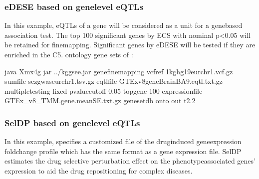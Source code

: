 \documentclass[letterpaper,10pt,english,openany,oneside]{sphinxmanual}
\begin{document}
\subsubsection{eDESE based on gene\sphinxhyphen{}level eQTLs}
\label{\detokenize{detailed_document:edese-based-on-gene-level-eqtls}}
\sphinxAtStartPar
In this example, eQTLs of a gene will be considered as a unit for a gene\sphinxhyphen{}based association test. The top 100 significant genes by ECS with nominal p\textless{}0.05 will be retained for fine\sphinxhyphen{}mapping. Significant genes by eDESE will be tested if they are enriched in the C5. ontology gene sets of :

\begin{sphinxVerbatim}[commandchars=\\\{\}]
java \PYGZhy{}Xmx4g \PYGZhy{}jar ../kggsee.jar 
  \PYGZhy{}\PYGZhy{}gene\PYGZhy{}finemapping 
  \PYGZhy{}\PYGZhy{}vcf\PYGZhy{}ref 1kg\PYGZus{}hg19\PYGZus{}eur\PYGZus{}chr1.vcf.gz 
  \PYGZhy{}\PYGZhy{}sum\PYGZhy{}file scz\PYGZus{}gwas\PYGZus{}eur\PYGZus{}chr1.tsv.gz 
  \PYGZhy{}\PYGZhy{}eqtl\PYGZhy{}file GTEx\PYGZus{}v8\PYGZus{}gene\PYGZus{}BrainBA9.eqtl.txt.gz 
  \PYGZhy{}\PYGZhy{}multiple\PYGZhy{}testing fixed 
  \PYGZhy{}\PYGZhy{}p\PYGZhy{}value\PYGZhy{}cutoff 0.05 
  \PYGZhy{}\PYGZhy{}top\PYGZhy{}gene 100 
  \PYGZhy{}\PYGZhy{}expression\PYGZhy{}file GTEx\_v8\_TMM.gene.meanSE.txt.gz 
  \PYGZhy{}\PYGZhy{}geneset\PYGZhy{}db onto 
  \PYGZhy{}\PYGZhy{}out t2.2
\end{sphinxVerbatim}


\subsubsection{SelDP based on gene\sphinxhyphen{}level eQTLs}
\label{\detokenize{detailed_document:seldp-based-on-gene-level-eqtls}}
\sphinxAtStartPar
In this example,  specifies a customized file of the drug\sphinxhyphen{}induced gene\sphinxhyphen{}expression fold\sphinxhyphen{}change profile which has the same format as a gene expression file. SelDP estimates the drug selective perturbation effect on the phenotype\sphinxhyphen{}associated genes’ expression to aid the drug repositioning for complex diseases.
\end{document}
